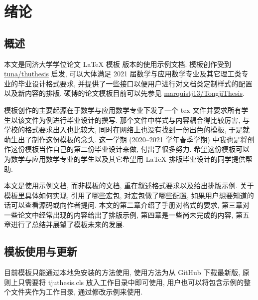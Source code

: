 
\section{绪论}

\subsection{概述}

本文是同济大学学位论文 LaTeX 模板 {\version} 版本的使用示例文档. 模板创作受到 \href{https://github.com/tuna/thuthesis}{tuna/thuthesis} 启发, 可以大体满足 2021 届数学与应用数学专业及其它理工类专业的毕业设计格式要求, 并提供了一些接口以便用户进行对文档类定制样式的配置以及新内容的排版. 硕博的论文模板目前可以先参见 \href{https://github.com/marquistj13/TongjiThesis}{marquistj13/TongjiThesis}.

模板创作的主要起源在于数学与应用数学专业下发了一个 tex 文件并要求所有学生以该文件为例进行毕业设计的撰写. 那个文件中样式与内容耦合得比较厉害, 与学校的格式要求出入也比较大, 同时在网络上也没有找到一份出色的模板, 于是就萌生出了制作这份模板的念头. 这一学期 (2020--2021 学年春季学期) 中我也是将创作这份模板当作自己的第二份毕业设计来做, 付出了很多努力. 希望这份模板可以为数学与应用数学专业的学生以及其它希望用 LaTeX 排版毕业设计的同学提供帮助.

本文是使用示例文档, 而非模板的文档, 重在叙述格式要求以及给出排版示例. 关于模板里具体如何实现, 引用了哪些宏包, 对宏包做了哪些配置, 如果用户想要知道的话可以查看源码或向作者提问. 本文的第二章介绍了手册对格式的要求, 第三章对一些论文中经常出现的内容给出了排版示例, 第四章是一些尚未完成的内容, 第五章进行了总结并展望了模板未来的发展.

\subsection{模板使用与更新}

目前模板只能通过本地免安装的方法使用, 使用方法为从 GitHub 下载最新版, 原则上只需要将 tjuthesis.cls 放入工作目录中即可使用, 用户也可以将包含示例的整个文件夹作为工作目录, 通过修改示例来使用.


